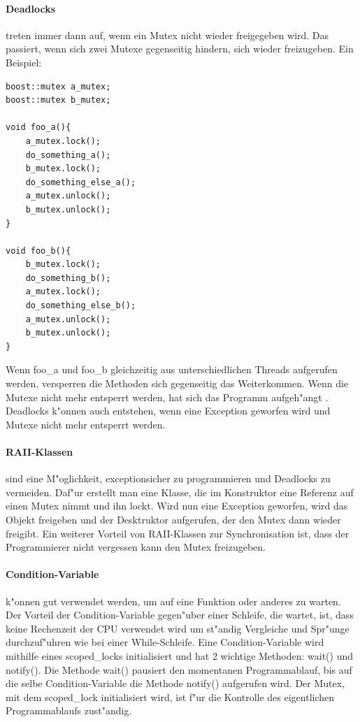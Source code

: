 \documentclass[14pt, a4paper]{report}
\begin{document}
\paragraph{Deadlocks} treten immer dann auf, wenn ein Mutex nicht wieder freigegeben 
wird. Das passiert, wenn sich zwei Mutexe gegenseitig hindern, sich wieder 
freizugeben. Ein Beispiel:
\begin{lstlisting}
boost::mutex a_mutex;
boost::mutex b_mutex;

void foo_a(){
	a_mutex.lock();
	do_something_a();
	b_mutex.lock();
	do_something_else_a();
	a_mutex.unlock();
	b_mutex.unlock();
}

void foo_b(){
	b_mutex.lock();
	do_something_b();
	a_mutex.lock();
	do_something_else_b();
	a_mutex.unlock();
	b_mutex.unlock();
}
\end{lstlisting}
Wenn foo\_a und foo\_b gleichzeitig aus unterschiedlichen Threads aufgerufen werden, 
versperren die Methoden sich gegenseitig das Weiterkommen. Wenn die Mutexe nicht mehr
entsperrt werden, hat sich das Programm
\glqq aufgeh"angt \grqq. Deadlocks k"onnen auch entstehen, wenn eine Exception geworfen wird und
Mutexe nicht mehr entsperrt werden.

\paragraph{RAII-Klassen} sind eine M"oglichkeit, exceptionsicher zu programmieren und 
Deadlocks zu vermeiden. Daf"ur erstellt man eine Klasse, die im Konstruktor eine 
Referenz auf einen Mutex nimmt und ihn lockt. Wird nun eine Exception geworfen, wird
das Objekt freigeben und der Desktruktor aufgerufen, der den Mutex dann wieder freigibt.
Ein weiterer Vorteil von RAII-Klassen zur Synchronisation ist, dass der Programmierer 
nicht vergessen kann den Mutex freizugeben.

\paragraph{Condition-Variable} k"onnen gut verwendet werden, um auf eine Funktion
oder anderes zu warten. Der Vorteil der Condition-Variable gegen"uber einer Schleife,
die wartet, ist, dass keine Rechenzeit der CPU verwendet wird um st"andig Vergleiche und
Spr"unge durchzuf"uhren wie bei einer While-Schleife. 
Eine Condition-Variable wird mithilfe eines scoped\_locks
initialisiert und hat 2 wichtige Methoden: wait() und notify(). Die Methode wait() 
pausiert den momentanen Programmablauf, bis auf die selbe Condition-Variable die Methode
notify() aufgerufen wird. Der Mutex, mit dem scoped\_lock initialisiert wird, ist f"ur die
Kontrolle des eigentlichen Programmablaufs zust"andig.
\end{document}
